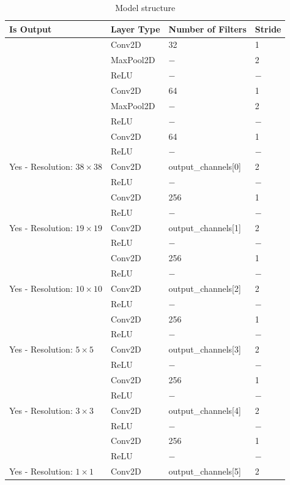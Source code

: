 \begin{table}[h!]
    \centering
    \caption*{Model structure}
    \begin{tabular}{l|l|l|l}
        \hline 
        Is Output & Layer Type & Number of Filters & Stride \\
        \hline 
            & Conv2D & 32 & 1 \\
            & MaxPool2D & $-$ & 2 \\
            & ReLU & $-$ & $-$ \\
            & Conv2D & 64 & 1 \\
            & MaxPool2D & $-$ & 2 \\
            & ReLU & $-$ & $-$ \\
            & Conv2D & 64 & 1 \\
            & ReLU & $-$ & $-$ \\
            Yes - Resolution: $38 \times 38$ & Conv2D & output\_channels[0] & 2 \\
        \hline
            & ReLU & $-$ & $-$ \\
            & Conv2D & 256 & 1 \\
            & ReLU & $-$ & $-$ \\
            Yes - Resolution: $19 \times 19$ & Conv2D & output\_channels[1] & 2 \\
        \hline 
            & ReLU & $-$ & $-$ \\
            & Conv2D & 256 & 1 \\
            & ReLU & $-$ & $-$ \\
            Yes - Resolution: $10 \times 10$ & Conv2D & output\_channels[2] & 2 \\
        \hline 
            & ReLU & $-$ & $-$ \\
            & Conv2D & 256 & 1 \\
            & ReLU & $-$ & $-$ \\
            Yes - Resolution: $5 \times 5$ & Conv2D & output\_channels[3] & 2 \\
        \hline 
            & ReLU & $-$ & $-$ \\
            & Conv2D & 256 & 1 \\
            & ReLU & $-$ & $-$ \\
            Yes - Resolution: $3 \times 3$ & Conv2D & output\_channels[4] & 2 \\
        \hline 
            & ReLU & $-$ & $-$ \\
            & Conv2D & 256 & 1 \\
            & ReLU & $-$ & $-$ \\
            Yes - Resolution: $1 \times 1$ & Conv2D & output\_channels[5] & 2 \\
        \hline
    \end{tabular}
\end{table}

